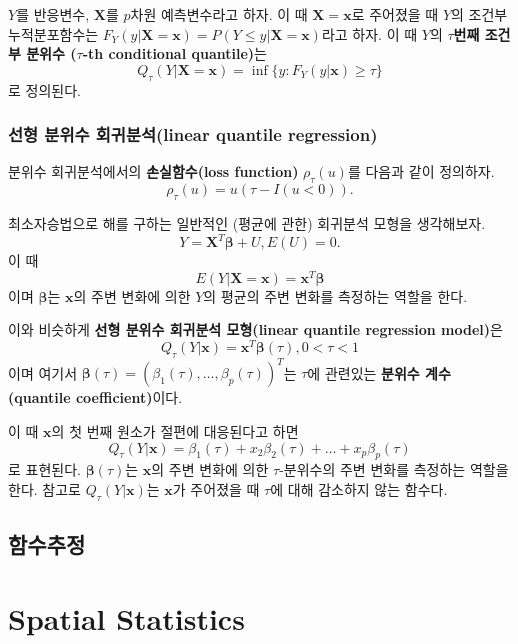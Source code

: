 \documentclass[b5paper,]{scrbook}
\theoremstyle{plain}
\theoremstyle{definition}
\numberwithin{equation}{section}
\let\BeginKnitrBlock\begin \let\EndKnitrBlock\end
\begin{document}
\BeginKnitrBlock{definition}[조건부 분위수]
\protect\hypertarget{def:unnamed-chunk-179}{}{\label{def:unnamed-chunk-179}
{} }\(Y\)를 반응변수, \(\mathbf{X}\)를
\(p\)차원 예측변수라고 하자. 이 때 \(\mathbf{X}=\mathbf{x}\)로 주어졌을
때 \(Y\)의 조건부 누적분포함수는
\(F_{Y}(y|\mathbf{X}=\mathbf{x})=P(Y\leq y|\mathbf{X}=\mathbf{x})\)라고
하자. 이 때 \(Y\)의 \(\tau\)\textbf{번째 조건부 분위수
(}\(\tau\)\textbf{-th conditional quantile)}는
\[Q_{\tau}(Y|\mathbf{X}=\mathbf{x})=\inf\{y:F_{Y}(y|\mathbf{x})\geq \tau\}\]
로 정의된다.
\EndKnitrBlock{definition}

\section{선형 분위수 회귀분석(linear quantile
regression)}\label{--linear-quantile-regression}

분위수 회귀분석에서의 \textbf{손실함수(loss function)}
\(\rho_{\tau}(u)\)를 다음과 같이 정의하자.
\[\rho_{\tau}(u)=u(\tau -I(u<0)).\]

최소자승법으로 해를 구하는 일반적인 (평균에 관한) 회귀분석 모형을
생각해보자. \[Y=\mathbf{X}^{T}\boldsymbol{\beta}+U, E(U)=0.\] 이 때
\[E(Y|\mathbf{X}=\mathbf{x})=\mathbf{x}^{T}\boldsymbol{\beta}\] 이며
\(\boldsymbol{\beta}\)는 \(\mathbf{x}\)의 주변 변화에 의한 \(Y\)의
평균의 주변 변화를 측정하는 역할을 한다.

이와 비슷하게 \textbf{선형 분위수 회귀분석 모형(linear quantile
regression model)}은
\[Q_{\tau}(Y|\mathbf{x})=\mathbf{x}^{T}\boldsymbol{\beta}(\tau), 0<\tau <1\]
이며 여기서
\(\boldsymbol{\beta}(\tau)=(\beta_{1}(\tau),\ldots , \beta_{p}(\tau))^{T}\)는
\(\tau\)에 관련있는 \textbf{분위수 계수(quantile coefficient)}이다.

이 때 \(\mathbf{x}\)의 첫 번째 원소가 절편에 대응된다고 하면
\[Q_{\tau}(Y|\mathbf{x})=\beta_{1}(\tau)+x_{2}\beta_{2}(\tau)+\ldots +x_{p}\beta_{p}(\tau)\]
로 표현된다. \(\boldsymbol{\beta}(\tau)\)는 \(\mathbf{x}\)의 주변 변화에
의한 \(\tau\)-분위수의 주변 변화를 측정하는 역할을 한다. 참고로
\(Q_{\tau}(Y|\mathbf{x})\)는 \(\mathbf{x}\)가 주어졌을 때 \(\tau\)에
대해 감소하지 않는 함수다.

\chapter{함수추정}\label{functionestimation}

\part{Spatial Statistics}\label{part-spatial-statistics}
\end{document}
